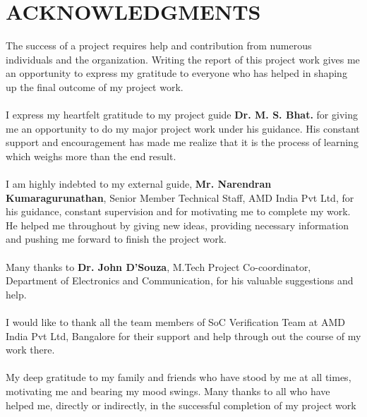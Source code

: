 \section*{\centering ACKNOWLEDGMENTS}
The success of a project requires help and contribution from numerous individuals and 
the organization. Writing the report of this project work gives me an opportunity to 
express my gratitude to everyone who has helped in shaping up the final outcome of my 
project work.
 \paragraph{} I express my heartfelt gratitude to my project guide {\bf Dr. M. S. Bhat.} for 
giving me an opportunity to do my major project work under his guidance. His constant 
support and encouragement has made me realize that it is the process of learning which 
weighs more than the end result.

\paragraph{}I am highly indebted to my external guide, {\bf Mr. Narendran Kumaragurunathan}, Senior Member Technical Staff, AMD India Pvt Ltd, for
his guidance, constant supervision and for motivating me to complete my work.
He helped me throughout by giving new ideas, providing necessary information and
pushing me forward to finish the project work. 

\paragraph{} Many thanks to {\bf Dr. John D'Souza}, M.Tech Project Co-coordinator, Department of 
Electronics and Communication, for his valuable suggestions and help.
\paragraph{} I would like to thank all the team members of SoC Verification Team at AMD India Pvt Ltd, Bangalore for their support and help through out the course of my work there.
\paragraph{} My deep gratitude to my family and friends who have stood by me at all times, motivating 
me and bearing my mood swings. Many thanks to all who have helped me, directly or indirectly, in 
the successful completion of my project work
